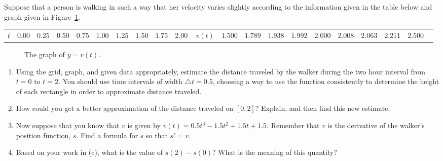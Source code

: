 \begin{activity} \label{A:4.1.1}  Suppose that a person is walking in such a way that her velocity varies slightly according to the information given in the table below and graph given in Figure~\ref{F:4.1.Act1}.
\begin{center} 
\begin{tabular}{c|c|c|c|c|c|c|c|c|c}
$t$ & 0.00 & $0.25$ & $0.50$ & $0.75$ & 1.00 & $1.25$ & $1.50$ & $1.75$ & $2.00$ \ \hline %
$v(t)$ & $1.500$ & $1.789$ & $1.938$ & $1.992$ & $2.000$ & $2.008$ & $2.063$ & $2.211$ & $2.500$ \ %
\end{tabular}
\end{center}
\begin{figure}[h]
\begin{center}
\end{center}
\caption{The graph of $y = v(t)$.} \label{F:4.1.Act1}
\end{figure}
\begin{enumerate}
	\item Using the grid, graph, and given data appropriately, estimate the distance traveled by the walker during the two hour interval from $t = 0$ to $t = 2$.  You should use time intervals of width $\triangle t = 0.5$, choosing a way to use the function consistently to determine the height of each rectangle in order to approximate distance traveled.
	\item How could you get a better approximation of the distance traveled on $[0,2]$?  Explain, and then find this new estimate.
	\item Now suppose that you know that $v$ is given by $v(t) = 0.5t^3-1.5t^2+1.5t+1.5$. Remember that $v$ is the derivative of the walker's position function, $s$.  Find a formula for $s$ so that $s' = v$.
	\item Based on your work in (c), what is the value of $s(2) - s(0)$?  What is the meaning of this quantity? 
\end{enumerate}
\end{activity}
